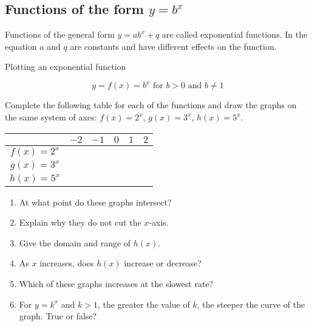 \subsection*{Functions of the form $y=b^{x}$}        
Functions of the general form $y=ab^{x}+q$ are called exponential functions. In the equation $a$ and $q$ are constants and have different effects on the function.
\par
{}
\begin{wex}{Plotting an exponential function}
{
\begin{equation*}
  y=f(x)=b^{x} \mbox{ for } b>0 \mbox{ and } b \neq 1
\end{equation*}

Complete the following table for each of the functions and draw the graphs on the same system of axes:
$f(x)=2^{x}$, $g(x)=3^{x}$, $h(x)=5^{x}$.


\begin{table}[H]
\begin{center}
\begin{tabular}{|c|c|c|c|c|c|}
\hline
   &  $-2$ & $-1$ & $0$ & $1$ & $2$ 
\\ \hline
 $f(x)=2^{x}$& \hspace{1cm}   & \hspace{1cm} & \hspace{1cm} & \hspace{1cm} & \hspace{1cm} 
\\ \hline
 $g(x)=3^{x}$&  &&&&
\\ \hline
 $h(x)=5^{x}$&  &&&&
\\ \hline

\end{tabular}
\end{center}
\end{table}

\begin{enumerate}[noitemsep, label=\textbf{\arabic*}. ] 
 \item At what point do these graphs intersect?
\item Explain why they do not cut the $x$-axis.
\item Give the domain and range of $h(x)$.
 \item As $x$ increases, does $h(x)$ increase or decrease?
\item Which of these graphs increases at the slowest rate?
\item For $y=k^{x}$ and $k>1$, the greater the value of $k$, the steeper the curve of the graph. True or false?
\end{enumerate}

}
\end{wex}
